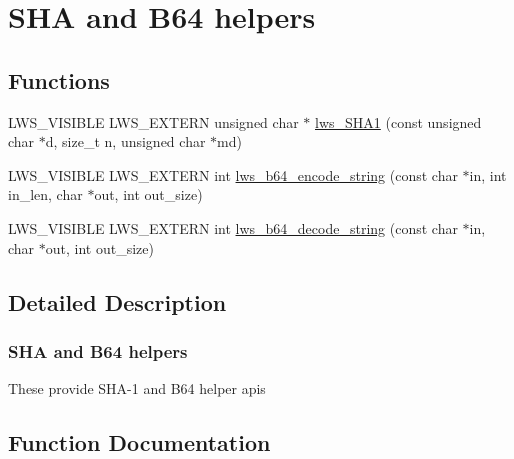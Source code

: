 \hypertarget{group__sha}{}\section{S\+HA and B64 helpers}
\label{group__sha}
\subsection*{Functions}
\begin{DoxyCompactItemize}
\item 
L\+W\+S\+\_\+\+V\+I\+S\+I\+B\+LE L\+W\+S\+\_\+\+E\+X\+T\+E\+RN unsigned char $\ast$ \hyperlink{group__sha_ga7b09ab74646266f0b555103b3bb8dfe5}{lws\+\_\+\+S\+H\+A1} (const unsigned char $\ast$d, size\+\_\+t n, unsigned char $\ast$md)
\item 
L\+W\+S\+\_\+\+V\+I\+S\+I\+B\+LE L\+W\+S\+\_\+\+E\+X\+T\+E\+RN int \hyperlink{group__sha_gaf39765e4a3b413efb65e4698b2ec3575}{lws\+\_\+b64\+\_\+encode\+\_\+string} (const char $\ast$in, int in\+\_\+len, char $\ast$out, int out\+\_\+size)
\item 
L\+W\+S\+\_\+\+V\+I\+S\+I\+B\+LE L\+W\+S\+\_\+\+E\+X\+T\+E\+RN int \hyperlink{group__sha_ga66316e6a5a0644a09d5a10e919dfdd8d}{lws\+\_\+b64\+\_\+decode\+\_\+string} (const char $\ast$in, char $\ast$out, int out\+\_\+size)
\end{DoxyCompactItemize}


\subsection{Detailed Description}
\subsubsection*{S\+HA and B64 helpers}

These provide S\+H\+A-\/1 and B64 helper apis 

\subsection{Function Documentation}
